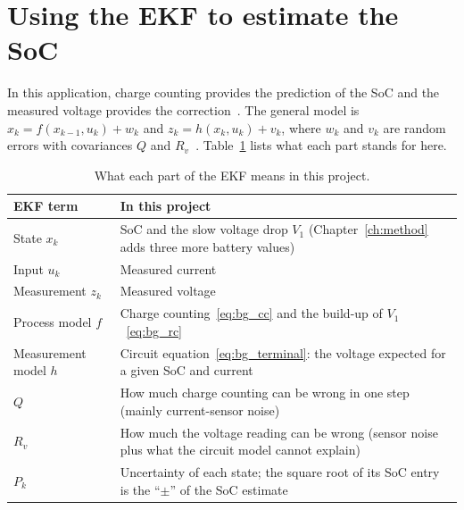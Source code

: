 \section{Using the EKF to estimate the SoC}\label{sec:bg_kf}

\label{sec:bg_kf_idea}\label{sec:bg_ss}\label{sec:bg_qr}In this application, charge counting provides the prediction of the SoC and the measured voltage provides the correction~\cite{mathworks_ekf_battery}. The general model is $x_k = f(x_{k-1}, u_k) + w_k$ and $z_k = h(x_k, u_k) + v_k$, where $w_k$ and $v_k$ are random errors with covariances $Q$ and $R_v$~\cite{welch2006intro,mathworks_kf_videos}.\label{eq:bg_process} Table~\ref{tab:bg_mapping} lists what each part stands for here.

\begin{table}[htbp]
  \centering
  \caption{What each part of the EKF means in this project.}
  \label{tab:bg_mapping}
  \small
  \begin{tabular}{@{}lp{}@{}}
    \toprule
    EKF term & In this project \\
    \midrule
    State $x_k$ & SoC and the slow voltage drop $V_1$ (Chapter~\ref{ch:method} adds three more battery values) \\
    Input $u_k$ & Measured current \\
    Measurement $z_k$ & Measured voltage \\
    Process model $f$ & Charge counting~\eqref{eq:bg_cc} and the build-up of $V_1$~\eqref{eq:bg_rc} \\
    Measurement model $h$ & Circuit equation~\eqref{eq:bg_terminal}: the voltage expected for a given SoC and current \\
    $Q$ & How much charge counting can be wrong in one step (mainly current-sensor noise) \\
    $R_v$ & How much the voltage reading can be wrong (sensor noise plus what the circuit model cannot explain) \\
    $P_k$ & Uncertainty of each state; the square root of its SoC entry is the ``$\pm$'' of the SoC estimate \\
    \bottomrule
  \end{tabular}
\end{table}

